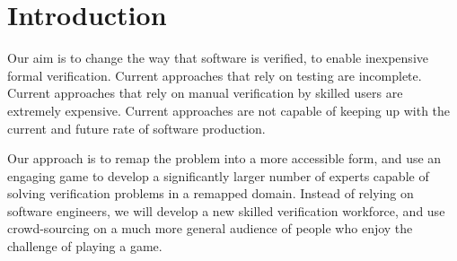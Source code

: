\documentclass[preprint]{sig-alternate}
\begin{document}

\section{Introduction}

Our aim is to change the way that software is verified, to enable
inexpensive formal verification.  Current approaches that rely on
testing are incomplete.  Current approaches that rely on manual
verification by skilled users are extremely expensive.  
Current approaches are not capable of keeping up with the
current and future rate of software production.

Our approach is to remap the problem into a more accessible
form, and use an engaging game to develop a significantly larger
number of experts capable of solving verification problems in a
remapped domain.  Instead of relying on software engineers, we will
develop a new skilled verification workforce, and use crowd-sourcing
on a much more general audience of people who enjoy the challenge of
playing a game.
\end{document}
